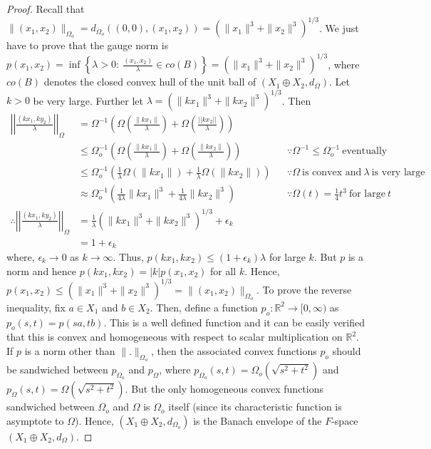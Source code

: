 \documentclass[pdflatex,sn-mathphys-num]{sn-jnl}%
\theoremstyle{thmstyleone}%
\theoremstyle{thmstyletwo}%
\theoremstyle{thmstylethree}%
\begin{document}
	\begin{proof}
		Recall that $\|(x_1,x_2)\|_{\Omega_o}=d_{\Omega_o}\left((0,0),(x_1,x_2)\right)=\left(\|x_1\|^3+\|x_2\|^3\right)^{1/3}$. We just have to prove that the gauge norm is $p(x_1,x_2)=\inf\left\{\lambda>0:~\frac{(x_1,x_2)}{\lambda}\in co(B)\right\}=\left(\|x_1\|^3+\|x_2\|^3\right)^{1/3}$, where $co(B)$ denotes the closed convex hull of the unit ball of $(X_1\oplus X_2, d_\Omega)$. Let $k>0$ be very large. Further let $\lambda=\left(\|kx_1\|^3+\|kx_2\|^3\right)^{1/3}$. Then
		\begin{align*}
			\left\vert\left\vert\frac{(kx_1,ky_2)}{\lambda}\right\vert\right\vert_\Omega&=\Omega^{-1}\left(\Omega\left(\frac{\|kx_1\|}{\lambda}\right)+\Omega\left(\frac{||kx_2||}{\lambda}\right)\right)\\&\leq \Omega_o^{-1}\left(\Omega\left(\frac{\|kx_1\|}{\lambda}\right)+\Omega\left(\frac{\|kx_2\|}{\lambda}\right)\right)&&\because \Omega^{-1}\leq \Omega_o^{-1}~\text{eventually}\\&\leq \Omega_o^{-1}\left(\frac{1}{\lambda}\Omega(\|kx_1\|)+\frac{1}{\lambda}\Omega(\|kx_2\|)\right)&&\because \Omega~\text{is convex and}~\lambda~\text{is very large}\\&\approx\Omega_o^{-1}\left(\frac{1}{4\lambda}\|kx_1\|^3+\frac{1}{4\lambda}\|kx_2\|^3\right)&&\because \Omega(t)=\frac{1}{4}t^3~\text{for large}~t\\\therefore\left\vert\left\vert\frac{(kx_1,ky_2)}{\lambda}\right\vert\right\vert_\Omega&=\frac{1}{\lambda}\left(\|kx_1\|^3+\|kx_2\|^3\right)^{1/3}+\epsilon_k\\&=1+\epsilon_k
		\end{align*}
		where, $\epsilon_k\to 0$ as $k\to \infty$. Thus, $p(kx_1,kx_2)\leq (1+\epsilon_k)\lambda$ for large $k$. But $p$ is a norm and hence $p(kx_1,kx_2)=|k|p(x_1,x_2)$ for all $k$. Hence, $p(x_1,x_2)\leq \left(\|x_1\|^3+\|x_2\|^3\right)^{1/3}=\|(x_1,x_2)\|_{\Omega_o}$. To prove the reverse inequality, fix $a\in X_1$ and $b\in X_2$. Then, define a  function $p_o:\mathbb R^2\to [0,\infty)$ as $p_o(s,t)=p(sa,tb)$. This is a well defined function and it can be easily verified that this is convex and homogeneous with respect to scalar multiplication on $\mathbb R^2$. If $p$ is a norm other than $\|.\|_{\Omega_o}$, then the associated convex functions $p_o$ should be sandwiched between  $p_{\Omega_o}$ and $p_\Omega$, where $p_{\Omega_o}(s,t)=\Omega_o(\sqrt{s^2+t^2})$ and $p_\Omega(s,t)=\Omega(\sqrt{s^2+t^2})$. But the only homogeneous convex functions sandwiched between $\Omega_o$ and $\Omega$ is $\Omega_o$ itself (since its characteristic function is asymptote to $\Omega$). Hence, $(X_1\oplus X_2,d_{\Omega_o})$ is the Banach envelope of the $F$-space $\left(X_1\oplus X_2, d_\Omega\right)$.
	\end{proof}
\end{document}
